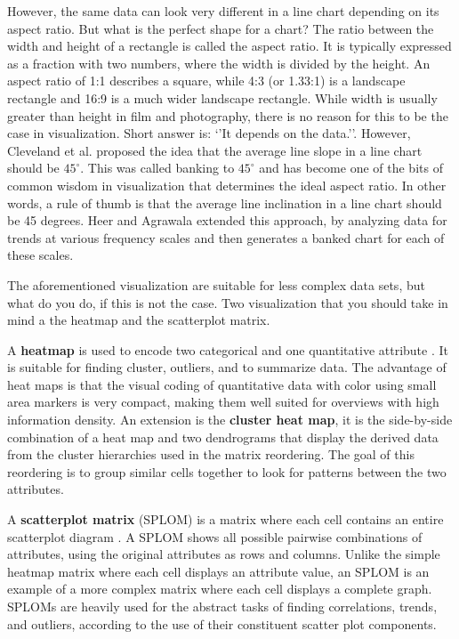 \documentclass[
]{book}
\begin{document}
However, the same data can look very different in a line chart depending on its aspect ratio. But what is the perfect shape for a chart? The ratio between the width and height of a rectangle is called the aspect ratio. It is typically expressed as a fraction with two numbers, where the width is divided by the height. An aspect ratio of 1:1 describes a square, while 4:3 (or 1.33:1) is a landscape rectangle and 16:9 is a much wider landscape rectangle. While width is usually greater than height in film and photography, there is no reason for this to be the case in visualization. Short answer is: `'It depends on the data.''. However, Cleveland et al. \citep{ClevelandMcGill1984graphicalperception} proposed the idea that the average line slope in a line chart should be \(45^{\circ}\). This was called banking to \(45^{\circ}\) and has become one of the bits of common wisdom in visualization that determines the ideal aspect ratio. In other words, a rule of thumb is that the average line inclination in a line chart should be 45 degrees. Heer and Agrawala \citep{HeerAgrawala2006banking} extended this approach, by analyzing data for trends at various frequency scales and then generates a banked chart for each of these scales.

The aforementioned visualization are suitable for less complex data sets, but what do you do, if this is not the case. Two visualization that you should take in mind a the heatmap and the scatterplot matrix.

A \textbf{heatmap} is used to encode two categorical and one quantitative attribute \citep{munzner2014visualization}. It is suitable for finding cluster, outliers, and to summarize data. The advantage of heat maps is that the visual coding of quantitative data with color using small area markers is very compact, making them well suited for overviews with high information density. An extension is the \textbf{cluster heat map}, it is the side-by-side combination of a heat map and two dendrograms that display the derived data from the cluster hierarchies used in the matrix reordering. The goal of this reordering is to group similar cells together to look for patterns between the two attributes.

A \textbf{scatterplot matrix} (SPLOM) is a matrix where each cell contains an entire scatterplot diagram \citep{munzner2014visualization}. A SPLOM shows all possible pairwise combinations of attributes, using the original attributes as rows and columns. Unlike the simple heatmap matrix where each cell displays an attribute value, an SPLOM is an example of a more complex matrix where each cell displays a complete graph. SPLOMs are heavily used for the abstract tasks of finding correlations, trends, and outliers, according to the use of their constituent scatter plot components.
\end{document}
